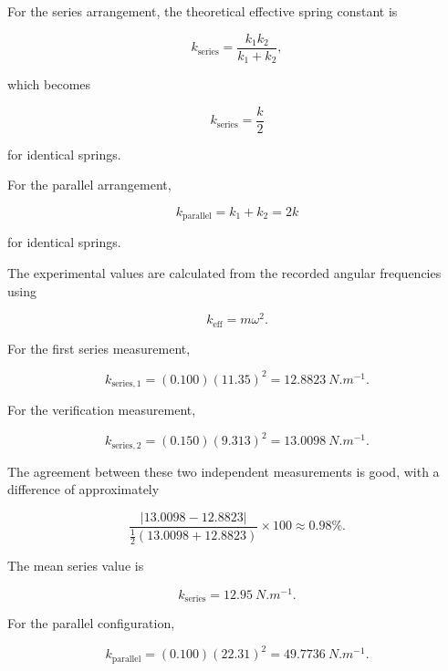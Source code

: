 \documentclass[12pt,a4paper]{article}
\begin{document}
For the series arrangement, the theoretical effective spring constant is

\begin{equation}
k_{\mathrm{series}}
=
\frac{k_1k_2}{k_1+k_2},
\end{equation}

which becomes

\begin{equation}
k_{\mathrm{series}}=\frac{k}{2}
\end{equation}

for identical springs.

For the parallel arrangement,

\begin{equation}
k_{\mathrm{parallel}}=k_1+k_2=2k
\end{equation}

for identical springs.

The experimental values are calculated from the recorded angular frequencies using

\begin{equation}
k_{\mathrm{eff}}=m\omega^2.
\end{equation}

For the first series measurement,

\begin{equation}
k_{\mathrm{series,1}}
=
(0.100)(11.35)^2
=
\SI{12.8823}{N.m^{-1}}.
\end{equation}

For the verification measurement,

\begin{equation}
k_{\mathrm{series,2}}
=
(0.150)(9.313)^2
=
\SI{13.0098}{N.m^{-1}}.
\end{equation}

The agreement between these two independent measurements is good, with a difference of approximately

\begin{equation}
\frac{|13.0098-12.8823|}
{\frac{1}{2}(13.0098+12.8823)}
\times100
\approx0.98\%.
\end{equation}

The mean series value is 

\begin{equation}
\boxed{
k_{\mathrm{series}} = \SI{12.95}{N.m^{-1}}
}.
\end{equation}

For the parallel configuration,

\begin{equation}
k_{\mathrm{parallel}}
=
(0.100)(22.31)^2
=
\boxed{\SI{49.7736}{N.m^{-1}}}.
\end{equation}
\end{document}

